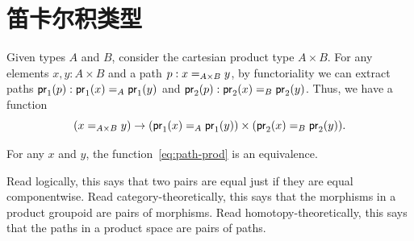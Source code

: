 \section{笛卡尔积类型}
\label{sec:compute-cartprod}

%
Given types $A$ and $B$, consider the cartesian product type $A \times B$.
For any elements $x,y:A\times B$ and a path $p:\id[A\times B]{x}{y}$, by functoriality we can extract paths $\ap{\proj1}p:\id[A]{\proj1(x)}{\proj1(y)}$ and $\ap{\proj2}p:\id[B]{\proj2(x)}{\proj2(y)}$.
Thus, we have a function
\begin{equation}\label{eq:path-prod}
  (\id[A\times B]{x}{y}) \to (\id[A]{\proj1(x)}{\proj1(y)}) \times (\id[B]{\proj2(x)}{\proj2(y)}).
\end{equation}

\begin{thm}\label{thm:path-prod}
  For any $x$ and $y$, the function~\eqref{eq:path-prod} is an equivalence.
\end{thm}

Read logically, this says that two pairs are equal just if they are equal
componentwise.  Read category-theoretically, this says that the
morphisms in a product groupoid are pairs of morphisms.  Read
homotopy-theoretically, this says that the paths in a product
space are pairs of paths.


